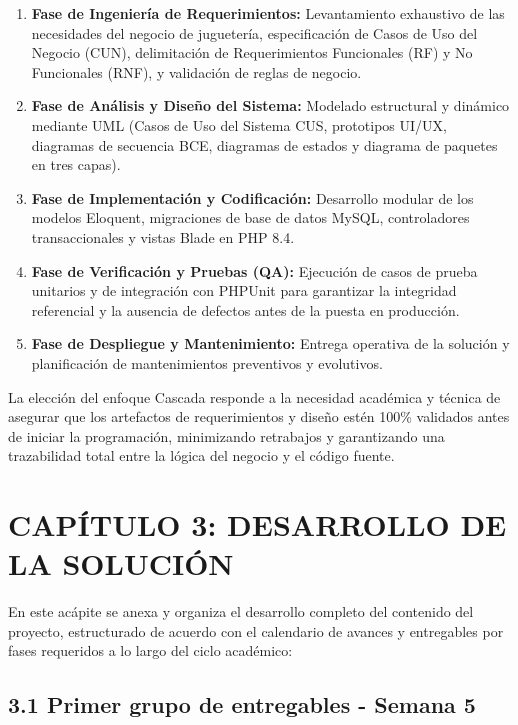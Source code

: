 \documentclass[12pt,a4paper]{article}
\begin{document}
\begin{enumerate}
    \item \textbf{Fase de Ingenier\'ia de Requerimientos:} Levantamiento exhaustivo de las necesidades del negocio de jugueter\'ia, especificaci\'on de Casos de Uso del Negocio (CUN), delimitaci\'on de Requerimientos Funcionales (RF) y No Funcionales (RNF), y validaci\'on de reglas de negocio.
    \item \textbf{Fase de An\'alisis y Dise\~no del Sistema:} Modelado estructural y din\'amico mediante UML (Casos de Uso del Sistema CUS, prototipos UI/UX, diagramas de secuencia BCE, diagramas de estados y diagrama de paquetes en tres capas).
    \item \textbf{Fase de Implementaci\'on y Codificaci\'on:} Desarrollo modular de los modelos Eloquent, migraciones de base de datos MySQL, controladores transaccionales y vistas Blade en PHP 8.4.
    \item \textbf{Fase de Verificaci\'on y Pruebas (QA):} Ejecuci\'on de casos de prueba unitarios y de integraci\'on con PHPUnit para garantizar la integridad referencial y la ausencia de defectos antes de la puesta en producci\'on.
    \item \textbf{Fase de Despliegue y Mantenimiento:} Entrega operativa de la soluci\'on y planificaci\'on de mantenimientos preventivos y evolutivos.
\end{enumerate}

La elecci\'on del enfoque Cascada responde a la necesidad acad\'emica y t\'ecnica de asegurar que los artefactos de requerimientos y dise\~no est\'en 100\% validados antes de iniciar la programaci\'on, minimizando retrabajos y garantizando una trazabilidad total entre la l\'ogica del negocio y el c\'odigo fuente.

\clearpage
\section{CAP\'ITULO 3: DESARROLLO DE LA SOLUCI\'ON}

En este ac\'apite se anexa y organiza el desarrollo completo del contenido del proyecto, estructurado de acuerdo con el calendario de avances y entregables por fases requeridos a lo largo del ciclo acad\'emico:

\subsection{3.1 Primer grupo de entregables - Semana 5}
\end{document}
